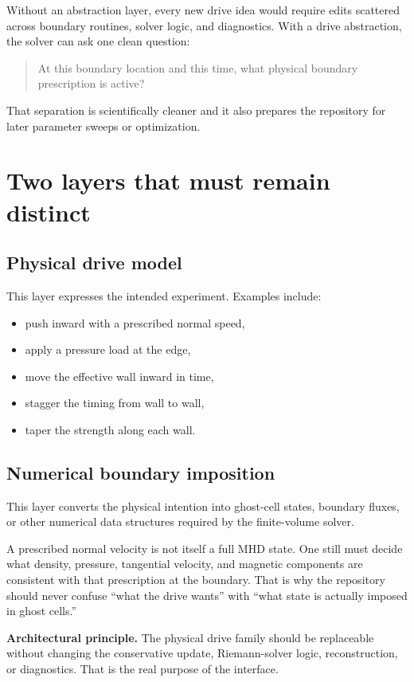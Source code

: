 \documentclass[11pt]{article}
\begin{document}
Without an abstraction layer, every new drive idea would require edits scattered across boundary routines, solver logic, and diagnostics. With a drive abstraction, the solver can ask one clean question:
\begin{quote}
At this boundary location and this time, what physical boundary prescription is active?
\end{quote}

That separation is scientifically cleaner and it also prepares the repository for later parameter sweeps or optimization.

\section{Two layers that must remain distinct}
\subsection{Physical drive model}
This layer expresses the intended experiment. Examples include:
\begin{itemize}
    \item push inward with a prescribed normal speed,
    \item apply a pressure load at the edge,
    \item move the effective wall inward in time,
    \item stagger the timing from wall to wall,
    \item taper the strength along each wall.
\end{itemize}

\subsection{Numerical boundary imposition}
This layer converts the physical intention into ghost-cell states, boundary fluxes, or other numerical data structures required by the finite-volume solver.

A prescribed normal velocity is not itself a full MHD state. One still must decide what density, pressure, tangential velocity, and magnetic components are consistent with that prescription at the boundary. That is why the repository should never confuse ``what the drive wants'' with ``what state is actually imposed in ghost cells.''

\begin{physicsbox}
\textbf{Architectural principle.} The physical drive family should be replaceable without changing the conservative update, Riemann-solver logic, reconstruction, or diagnostics. That is the real purpose of the interface.
\end{physicsbox}
\end{document}

